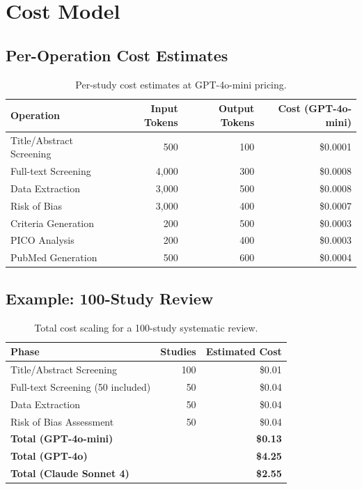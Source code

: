 \documentclass[11pt,a4paper]{article}
\begin{document}
\section{Cost Model}

\subsection{Per-Operation Cost Estimates}

\begin{table}[H]
\centering
\begin{tabular}{lrrr}
\toprule
\textbf{Operation} & \textbf{Input Tokens} & \textbf{Output Tokens} & \textbf{Cost (GPT-4o-mini)} \\
\midrule
Title/Abstract Screening & 500 & 100 & \$0.0001 \\
Full-text Screening & 4,000 & 300 & \$0.0008 \\
Data Extraction & 3,000 & 500 & \$0.0008 \\
Risk of Bias & 3,000 & 400 & \$0.0007 \\
Criteria Generation & 200 & 500 & \$0.0003 \\
PICO Analysis & 200 & 400 & \$0.0003 \\
PubMed Generation & 500 & 600 & \$0.0004 \\
\bottomrule
\end{tabular}
\caption{Per-study cost estimates at GPT-4o-mini pricing.}
\end{table}

\subsection{Example: 100-Study Review}

\begin{table}[H]
\centering
\begin{tabular}{lrr}
\toprule
\textbf{Phase} & \textbf{Studies} & \textbf{Estimated Cost} \\
\midrule
Title/Abstract Screening & 100 & \$0.01 \\
Full-text Screening (50 included) & 50 & \$0.04 \\
Data Extraction & 50 & \$0.04 \\
Risk of Bias Assessment & 50 & \$0.04 \\
\midrule
\textbf{Total (GPT-4o-mini)} & & \textbf{\$0.13} \\
\textbf{Total (GPT-4o)} & & \textbf{\$4.25} \\
\textbf{Total (Claude Sonnet 4)} & & \textbf{\$2.55} \\
\bottomrule
\end{tabular}
\caption{Total cost scaling for a 100-study systematic review.}
\end{table}
\end{document}
